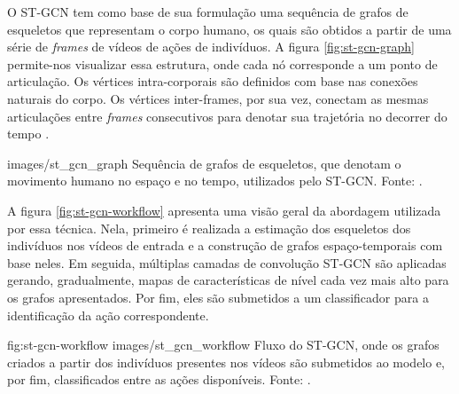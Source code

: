 
O ST-GCN tem como base de sua formulação uma sequência de grafos de esqueletos que representam o corpo humano, os quais são obtidos a partir de uma série de \textit{frames} de vídeos de ações de indivíduos. A figura \ref{fig:st-gcn-graph} permite-nos visualizar essa estrutura, onde cada nó corresponde a um ponto de articulação. Os vértices intra-corporais são definidos com base nas conexões naturais do corpo. Os vértices inter-frames, por sua vez, conectam as mesmas articulações entre \textit{frames} consecutivos para denotar sua trajetória no decorrer do tempo \cite{st-gcn-2018}.

    {images/st_gcn_graph}
    {Sequência de grafos de esqueletos, que denotam o movimento humano no espaço e no tempo, utilizados pelo ST-GCN. Fonte: \cite[p. 1]{st-gcn-2018}.}

A figura \ref{fig:st-gcn-workflow} apresenta uma visão geral da abordagem utilizada por essa técnica. Nela, primeiro é realizada a estimação dos esqueletos dos indivíduos nos vídeos de entrada e a construção de grafos espaço-temporais com base neles. Em seguida, múltiplas camadas de convolução ST-GCN são aplicadas gerando, gradualmente, mapas de características de nível cada vez mais alto para os grafos apresentados. Por fim, eles são submetidos a um classificador para a identificação da ação correspondente.

\image
    {fig:st-gcn-workflow}
    {images/st_gcn_workflow}
    {Fluxo do ST-GCN, onde os grafos criados a partir dos indivíduos presentes nos vídeos são submetidos ao modelo e, por fim, classificados entre as ações disponíveis. Fonte: \cite[p. 3]{st-gcn-2018}.}



